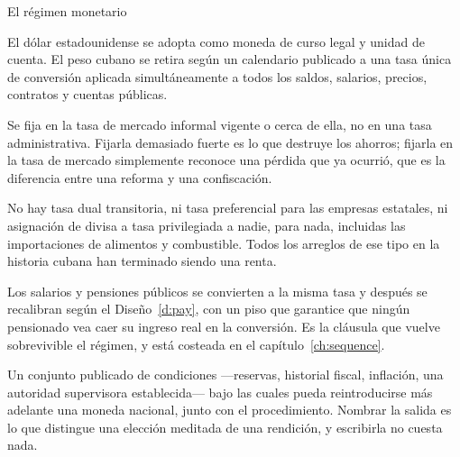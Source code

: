 \begin{design}{El régimen monetario}
\label{d:regime}
\begin{rules}
 El dólar estadounidense se adopta como moneda de curso legal y unidad
de cuenta. El peso cubano se retira según un calendario publicado a una tasa única de
conversión aplicada simultáneamente a todos los saldos, salarios, precios, contratos y
cuentas públicas.

 Se fija en la tasa de mercado informal vigente o cerca de
ella, no en una tasa administrativa. Fijarla demasiado fuerte es lo que destruye los
ahorros; fijarla en la tasa de mercado simplemente reconoce una pérdida que ya ocurrió,
que es la diferencia entre una reforma y una confiscación.

 No hay tasa dual transitoria, ni tasa preferencial para
las empresas estatales, ni asignación de divisa a tasa privilegiada a nadie, para nada,
incluidas las importaciones de alimentos y combustible. Todos los arreglos de ese tipo
en la historia cubana han terminado siendo una renta.

 Los salarios y pensiones públicos se
convierten a la misma tasa y después se recalibran según el Diseño~\ref{d:pay}, con un
piso que garantice que ningún pensionado vea caer su ingreso real en la conversión. Es
la cláusula que vuelve sobrevivible el régimen, y está costeada en el
capítulo~\ref{ch:sequence}.

 Un conjunto publicado de condiciones ---reservas, historial fiscal,
inflación, una autoridad supervisora establecida--- bajo las cuales pueda reintroducirse
más adelante una moneda nacional, junto con el procedimiento. Nombrar la salida es lo
que distingue una elección meditada de una rendición, y escribirla no cuesta nada.
\end{rules}
\end{design}

